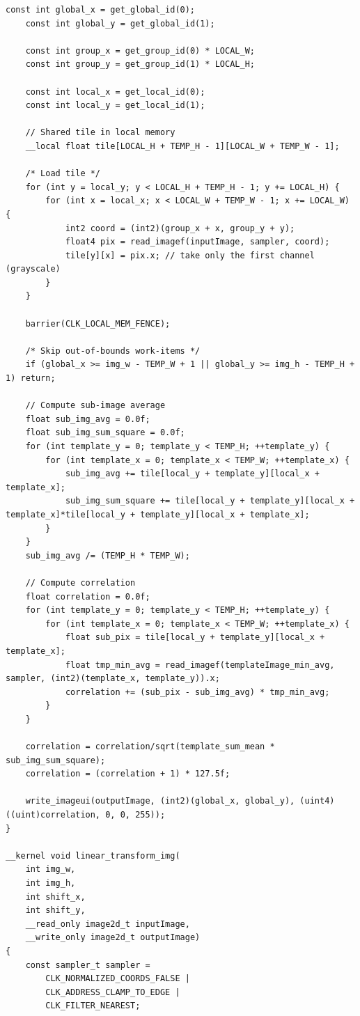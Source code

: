 \documentclass[12pt]{article}
\begin{document}
\begin{lstlisting}[style=CStyle, caption={prog.c}, label={annex:prog}]
    const int global_x = get_global_id(0);
    const int global_y = get_global_id(1);

    const int group_x = get_group_id(0) * LOCAL_W;
    const int group_y = get_group_id(1) * LOCAL_H;

    const int local_x = get_local_id(0);
    const int local_y = get_local_id(1);

    // Shared tile in local memory
    __local float tile[LOCAL_H + TEMP_H - 1][LOCAL_W + TEMP_W - 1];

    /* Load tile */
    for (int y = local_y; y < LOCAL_H + TEMP_H - 1; y += LOCAL_H) {
        for (int x = local_x; x < LOCAL_W + TEMP_W - 1; x += LOCAL_W) {
            int2 coord = (int2)(group_x + x, group_y + y);
            float4 pix = read_imagef(inputImage, sampler, coord);
            tile[y][x] = pix.x; // take only the first channel (grayscale)
        }
    }

    barrier(CLK_LOCAL_MEM_FENCE);

    /* Skip out-of-bounds work-items */
    if (global_x >= img_w - TEMP_W + 1 || global_y >= img_h - TEMP_H + 1) return;

    // Compute sub-image average
    float sub_img_avg = 0.0f;
    float sub_img_sum_square = 0.0f;
    for (int template_y = 0; template_y < TEMP_H; ++template_y) {
        for (int template_x = 0; template_x < TEMP_W; ++template_x) {
            sub_img_avg += tile[local_y + template_y][local_x + template_x];
            sub_img_sum_square += tile[local_y + template_y][local_x + template_x]*tile[local_y + template_y][local_x + template_x];
        }
    }
    sub_img_avg /= (TEMP_H * TEMP_W);

    // Compute correlation
    float correlation = 0.0f;
    for (int template_y = 0; template_y < TEMP_H; ++template_y) {
        for (int template_x = 0; template_x < TEMP_W; ++template_x) {
            float sub_pix = tile[local_y + template_y][local_x + template_x];
            float tmp_min_avg = read_imagef(templateImage_min_avg, sampler, (int2)(template_x, template_y)).x;
            correlation += (sub_pix - sub_img_avg) * tmp_min_avg;
        }
    }

    correlation = correlation/sqrt(template_sum_mean * sub_img_sum_square);
    correlation = (correlation + 1) * 127.5f;

    write_imageui(outputImage, (int2)(global_x, global_y), (uint4)((uint)correlation, 0, 0, 255));
}

__kernel void linear_transform_img(
    int img_w,
    int img_h,
    int shift_x,
    int shift_y,
    __read_only image2d_t inputImage,
    __write_only image2d_t outputImage) 
{
    const sampler_t sampler =
        CLK_NORMALIZED_COORDS_FALSE |
        CLK_ADDRESS_CLAMP_TO_EDGE |
        CLK_FILTER_NEAREST;


\end{lstlisting}
\end{document}

